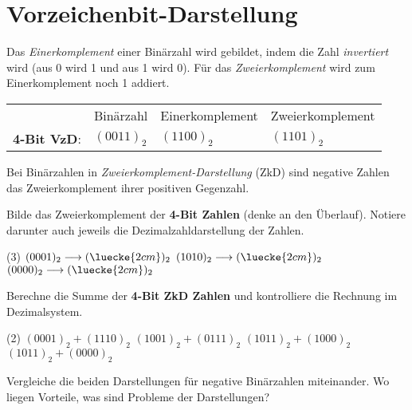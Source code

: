 \documentclass[9pt, a4paper]{scrartcl}
\begin{document}
\section*{Vorzeichenbit-Darstellung}
\begin{infobox}
Das \emph{Einerkomplement} einer Binärzahl wird gebildet, indem die Zahl \emph{invertiert} wird (aus 0 wird 1 und aus 1 wird 0). Für das \emph{Zweierkomplement} wird zum Einerkomplement noch 1 addiert.

\begin{tabularx}{\textwidth}{XXXX}
	 & Binärzahl & Einerkomplement & Zweierkomplement \\
	\textbf{4-Bit VzD}: & $(0011)_2$ & $(1100)_2$ & $(1101)_2$
\end{tabularx}

Bei Binärzahlen in \emph{Zweierkomplement-Darstellung} (ZkD) sind negative Zahlen das Zweierkomplement ihrer positiven Gegenzahl.
\end{infobox}

\begin{aufgabe}
	Bilde das Zweierkomplement der \textbf{4-Bit Zahlen} (denke an den Überlauf). Notiere darunter auch jeweils die Dezimalzahldarstellung der Zahlen.
	
	\begin{tasks}(3)
		\task $(0001)_2 \longrightarrow (\luecke{2cm})_2$
		\task $(1010)_2 \longrightarrow (\luecke{2cm})_2$
		\task $(0000)_2 \longrightarrow (\luecke{2cm})_2$
	\end{tasks}	
\end{aufgabe}

\begin{aufgabe}
	Berechne die Summe der \textbf{4-Bit ZkD Zahlen} und kontrolliere die Rechnung im Dezimalsystem.
	
	\begin{tasks}(2)
		\task $(0001)_2 + (1110)_2$
		\task $(1001)_2 + (0111)_2$
		\task $(1011)_2 + (1000)_2$
		\task $(1011)_2 + (0000)_2$
	\end{tasks}
\end{aufgabe}

\begin{aufgabe}
	Vergleiche die beiden Darstellungen für negative Binärzahlen miteinander. Wo liegen Vorteile, was sind Probleme der Darstellungen?
\end{aufgabe}
\end{document}
